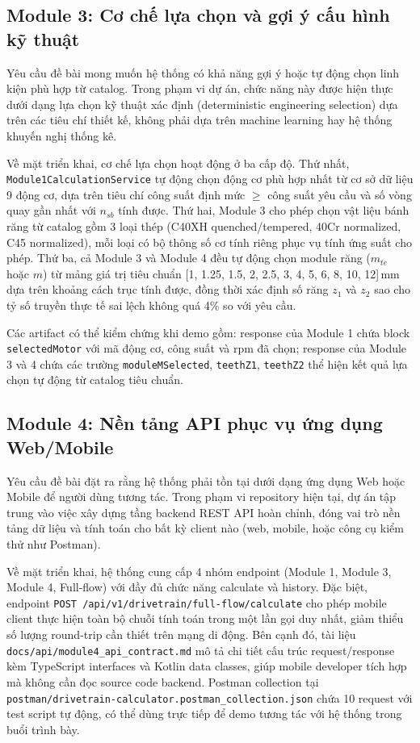 \documentclass[a4paper]{article}
\begin{document}
\subsection{Module 3: Cơ chế lựa chọn và gợi ý cấu hình kỹ thuật}

Yêu cầu đề bài mong muốn hệ thống có khả năng gợi ý hoặc tự động chọn linh kiện phù hợp từ catalog. Trong phạm vi dự án, chức năng này được hiện thực dưới dạng lựa chọn kỹ thuật xác định (deterministic engineering selection) dựa trên các tiêu chí thiết kế, không phải dựa trên machine learning hay hệ thống khuyến nghị thống kê.

Về mặt triển khai, cơ chế lựa chọn hoạt động ở ba cấp độ. Thứ nhất, \texttt{Module1CalculationService} tự động chọn động cơ phù hợp nhất từ cơ sở dữ liệu 9 động cơ, dựa trên tiêu chí công suất định mức $\ge$ công suất yêu cầu và số vòng quay gần nhất với $n_{sb}$ tính được. Thứ hai, Module 3 cho phép chọn vật liệu bánh răng từ catalog gồm 3 loại thép (C40XH quenched/tempered, 40Cr normalized, C45 normalized), mỗi loại có bộ thông số cơ tính riêng phục vụ tính ứng suất cho phép. Thứ ba, cả Module 3 và Module 4 đều tự động chọn module răng ($m_{te}$ hoặc $m$) từ mảng giá trị tiêu chuẩn [1, 1.25, 1.5, 2, 2.5, 3, 4, 5, 6, 8, 10, 12]\,mm dựa trên khoảng cách trục tính được, đồng thời xác định số răng $z_1$ và $z_2$ sao cho tỷ số truyền thực tế sai lệch không quá 4\% so với yêu cầu.

Các artifact có thể kiểm chứng khi demo gồm: response của Module 1 chứa block \texttt{selectedMotor} với mã động cơ, công suất và rpm đã chọn; response của Module 3 và 4 chứa các trường \texttt{moduleMSelected}, \texttt{teethZ1}, \texttt{teethZ2} thể hiện kết quả lựa chọn tự động từ catalog tiêu chuẩn.

\subsection{Module 4: Nền tảng API phục vụ ứng dụng Web/Mobile}

Yêu cầu đề bài đặt ra rằng hệ thống phải tồn tại dưới dạng ứng dụng Web hoặc Mobile để người dùng tương tác. Trong phạm vi repository hiện tại, dự án tập trung vào việc xây dựng tầng backend REST API hoàn chỉnh, đóng vai trò nền tảng dữ liệu và tính toán cho bất kỳ client nào (web, mobile, hoặc công cụ kiểm thử như Postman).

Về mặt triển khai, hệ thống cung cấp 4 nhóm endpoint (Module 1, Module 3, Module 4, Full-flow) với đầy đủ chức năng calculate và history. Đặc biệt, endpoint \texttt{POST /api/v1/drivetrain/full-flow/calculate} cho phép mobile client thực hiện toàn bộ chuỗi tính toán trong một lần gọi duy nhất, giảm thiểu số lượng round-trip cần thiết trên mạng di động. Bên cạnh đó, tài liệu \texttt{docs/api/module4\_api\_contract.md} mô tả chi tiết cấu trúc request/response kèm TypeScript interfaces và Kotlin data classes, giúp mobile developer tích hợp mà không cần đọc source code backend. Postman collection tại \texttt{postman/drivetrain-calculator.postman\_collection.json} chứa 10 request với test script tự động, có thể dùng trực tiếp để demo tương tác với hệ thống trong buổi trình bày.
\end{document}
